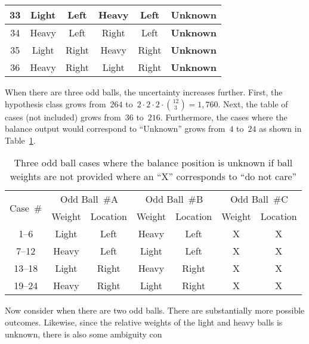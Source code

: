 \begin{table}[H]
\begin{tabular}{|c||c|c||c|c||c|}
      33  &  Light   &  Left     &  Heavy   &  Left    &  \textbf{Unknown} \\ \hline
      34  &  Heavy   &  Left     &  Right   &  Left    &  \textbf{Unknown} \\ \hline
      35  &  Light   &  Right    &  Heavy   &  Right   &  \textbf{Unknown} \\ \hline
      36  &  Heavy   &  Right    &  Light   &  Right   &  \textbf{Unknown} \\ \hline
    \end{tabular}
  \end{table}
  
  When there are three odd balls, the uncertainty increases further.  First, the hypothesis class grows from~$264$ to~${2\cdot2\cdot2\cdot\binom{12}{3} = 1,760}$.  Next, the table of cases (not included) grows from~$36$ to~$216$.  Furthermore, the cases where the balance output would correspond to ``Unknown'' grows from~$4$ to~$24$ as shown in Table~\ref{tab:p1ThreeBallsUnknownWeights}.
  
  \begin{table}[H]
    \centering
    \caption{Three odd ball cases where the balance position is unknown if ball weights are not provided where an ``X'' corresponds to ``do not care''}\label{tab:p1ThreeBallsUnknownWeights}
    \begin{tabular}{|c||c|c||c|c||c|c||}
      \hline
      \multirow{2}{*}{Case~\#} & \multicolumn{2}{c||}{Odd Ball~\#A} & \multicolumn{2}{c||}{Odd Ball~\#B} & \multicolumn{2}{c||}{Odd Ball~\#C}\\\cline{2-7}
          &  Weight  &  Location &  Weight  &  Location &  Weight  &  Location  \\ \hline\hline
      
      1--6   &  Light &  Left  &  Heavy &  Left  &  X &  X   \\ \hline
      7--12  &  Heavy &  Left  &  Light &  Left  &  X &  X   \\ \hline
      13--18 &  Light &  Right &  Heavy &  Right &  X &  X   \\ \hline
      19--24 &  Heavy &  Right &  Light &  Right &  X &  X   \\ \hline
    \end{tabular}
  \end{table}
  
  Now consider when there are two odd balls.  There are substantially more possible outcomes.  Likewise, since the relative weights of the light and heavy balls is unknown, there is also some ambiguity con

